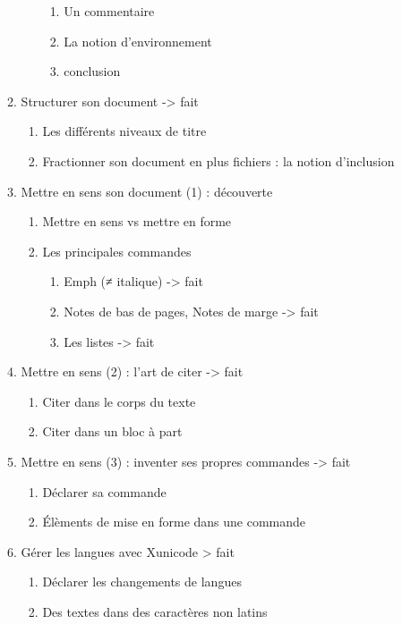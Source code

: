 \begin{enumerate}
\begin{enumerate}
\begin{enumerate}
\begin{enumerate}
			\item Un commentaire
			\item La notion d'environnement
			\item conclusion	
		\end{enumerate}
	\end{enumerate} 
	\item{Structurer son document}						-> fait
		\begin{enumerate}	
		\item Les différents niveaux de titre
		\item Fractionner son document en plus fichiers : la notion d'inclusion
		\end{enumerate}
	\item Mettre en sens son document (1) : découverte
	\begin{enumerate}
		\item Mettre en sens vs mettre en forme
		\item Les principales commandes
		\begin{enumerate}
			\item Emph (≠ italique)					-> fait
			\item Notes de bas de pages, Notes de marge	-> fait
			\item Les listes						-> fait
		\end{enumerate}
	\end{enumerate}
	\item Mettre en sens (2) : l'art de citer					-> fait
		\begin{enumerate}
		\item Citer dans le corps du texte	
		\item Citer dans un bloc à part
		\end{enumerate}
	\item Mettre en sens (3) : inventer ses propres commandes	-> fait
		\begin{enumerate}
		\item Déclarer sa commande
		\item Élèments de mise en forme dans une commande
		\end{enumerate}
	\item Gérer les langues avec Xunicode					 > fait
		\begin{enumerate}
		\item Déclarer les changements de langues
		\item Des textes dans des caractères non latins
		\begin{enumerate}

\end{enumerate}
\end{enumerate}
\end{enumerate}
\end{enumerate}
